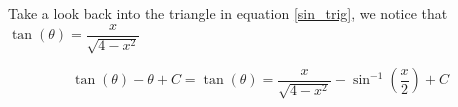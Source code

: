 \begin{center}
\begin{example}{}{}
    	Take a look back into the triangle in equation \ref{sin_trig}, we notice that $\tan{(\theta)}=\dfrac{x}{\sqrt{4-x^2}}$
    	
    	$$\tan{(\theta)}-\theta+C=\tan{(\theta)}=\dfrac{x}{\sqrt{4-x^2}}-\sin^{-1}{\left(\frac{x}{2}\right)}+C$$
    	\end{example}
	\end{center}
	